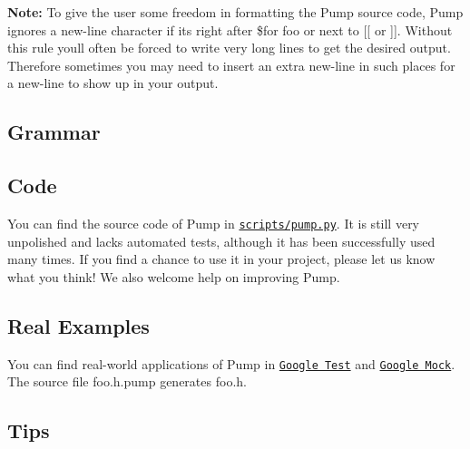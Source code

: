 {\bfseries Note\+:} To give the user some freedom in formatting the Pump source code, Pump ignores a new-\/line character if it\textquotesingle{}s right after {\ttfamily \$for foo} or next to {\ttfamily \mbox{[}\mbox{[}} or {\ttfamily \mbox{]}\mbox{]}}. Without this rule you\textquotesingle{}ll often be forced to write very long lines to get the desired output. Therefore sometimes you may need to insert an extra new-\/line in such places for a new-\/line to show up in your output.

\subsection*{Grammar}




\subsection*{Code}

You can find the source code of Pump in \href{../scripts/pump.py}{\tt scripts/pump.\+py}. It is still very unpolished and lacks automated tests, although it has been successfully used many times. If you find a chance to use it in your project, please let us know what you think! We also welcome help on improving Pump.

\subsection*{Real Examples}

You can find real-\/world applications of Pump in \href{https://github.com/google/googletest/tree/master/googletest}{\tt Google Test} and \href{https://github.com/google/googletest/tree/master/googlemock}{\tt Google Mock}. The source file {\ttfamily foo.\+h.\+pump} generates {\ttfamily foo.\+h}.

\subsection*{Tips}


